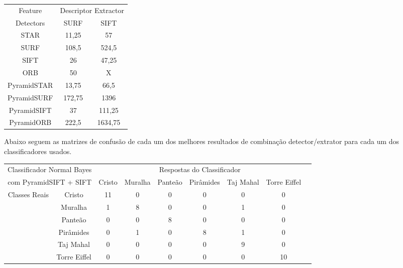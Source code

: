 \documentclass[a4paper,11pt]{article}
\begin{document}
  \vspace{20pt}
  \hspace{65pt}
  \begin{tabular}{|c|c|c|}
    \hline
    Feature &  \multicolumn{2}{|c|}{Descriptor Extractor} \\
    \cline{2-3}
     Detectors & SURF & SIFT \\
    \hline
    STAR & 11,25 & 57 \\
    SURF & 108,5 & 524,5 \\
    SIFT  & 26 & 47,25 \\
    ORB  & 50 & X \\
    PyramidSTAR & 13,75 & 66,5 \\
    PyramidSURF & 172,75 & 1396 \\
    PyramidSIFT & 37 & 111,25 \\
    PyramidORB & 222,5 & 1634,75 \\
    \hline
  \end{tabular}
  \bigskip
  \vspace{10pt}

  Abaixo seguem as matrizes de confusão de cada um dos melhores resultados de
  combinação detector/extrator para cada um dos classificadores usados.

  \hspace{-75pt}
  \begin{tabular}{|cc|c|c|c|c|c|c|c|}
    \hline
    \multicolumn{2}{|c|}{Classificador Normal Bayes} &
    \multicolumn{6}{|c|}{Respostas do Classificador} \\
    \cline{3-8}
    \multicolumn{2}{|c|}{com PyramidSIFT + SIFT}
    & Cristo & Muralha & Panteão & Pirâmides & Taj Mahal & Torre Eiffel \\
    \hline
    \multirow{6}{*}{Classes Reais}
    & \multicolumn{1}{|c|}{Cristo} & 11 & 0 & 0 & 0 & 0 & 0 \\
    \cline{2-8}
    & \multicolumn{1}{|c|}{Muralha} & 1 & 8 & 0 & 0 & 1 & 0\\
    \cline{2-8}
    & \multicolumn{1}{|c|}{Panteão} & 0 & 0 & 8 & 0 & 0 & 0\\
    \cline{2-8}
    & \multicolumn{1}{|c|}{Pirâmides} & 0 & 1 & 0 & 8 & 1 & 0\\
    \cline{2-8}
    & \multicolumn{1}{|c|}{Taj Mahal} & 0 & 0 & 0 & 0 & 9 & 0\\
    \cline{2-8}
    & \multicolumn{1}{|c|}{Torre Eiffel} & 0 & 0 & 0 & 0 & 0 & 10\\
    \hline
  \end{tabular}
  \bigskip
  
\end{document}
